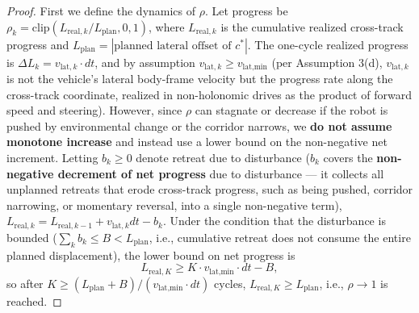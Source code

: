 \documentclass[11pt]{article}
\begin{document}
\begin{proof}
First we define the dynamics of $\rho$. Let progress be $\rho_k = \mathrm{clip}(L_{\text{real},k}/L_{\text{plan}}, 0, 1)$, where $L_{\text{real},k}$ is the cumulative realized cross-track progress and $L_{\text{plan}} = |\text{planned lateral offset of } c^*|$. The one-cycle realized progress is $\Delta L_k = v_{\text{lat},k} \cdot dt$, and by assumption $v_{\text{lat},k} \ge v_{\text{lat,min}}$ (per Assumption 3(d), $v_{\text{lat},k}$ is not the vehicle's lateral body-frame velocity but the progress rate along the cross-track coordinate, realized in non-holonomic drives as the product of forward speed and steering). However, since $\rho$ can stagnate or decrease if the robot is pushed by environmental change or the corridor narrows, we \textbf{do not assume monotone increase} and instead use a lower bound on the non-negative net increment. Letting $b_k \ge 0$ denote retreat due to disturbance ($b_k$ covers the \textbf{non-negative decrement of net progress} due to disturbance --- it collects all unplanned retreats that erode cross-track progress, such as being pushed, corridor narrowing, or momentary reversal, into a single non-negative term), $L_{\text{real},k} = L_{\text{real},k-1} + v_{\text{lat},k} dt - b_k$. Under the condition that the disturbance is bounded ($\sum_k b_k \le B < L_{\text{plan}}$, i.e., cumulative retreat does not consume the entire planned displacement), the lower bound on net progress is
\begin{equation}
L_{\text{real},K} \ge K \cdot v_{\text{lat,min}} \cdot dt - B,
\end{equation}
so after $K \ge (L_{\text{plan}} + B)/(v_{\text{lat,min}} \cdot dt)$ cycles, $L_{\text{real},K} \ge L_{\text{plan}}$, i.e., $\rho \to 1$ is reached.


\end{proof}
\end{document}
